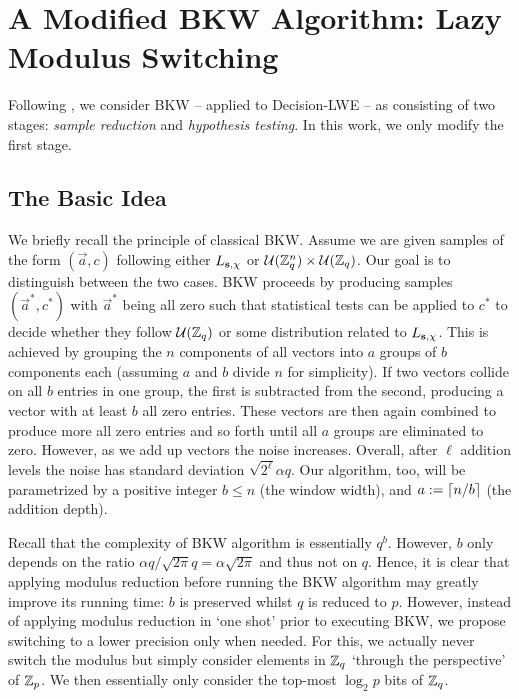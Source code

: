 \section{A Modified BKW Algorithm: Lazy Modulus Switching} \label{sec:bkw-algorithm}
Following \cite{albrecht-cid-faugere-fitzpatrick-perret:dcc2013}, we consider BKW -- applied to Decision-LWE -- as consisting of two stages: {\it sample reduction}  and {\it hypothesis testing}. In this work,  we only modify the first stage.

\subsection{The Basic Idea} 
We briefly recall the principle of classical BKW. Assume we are given samples of the form $(\vec{a}, c)$ following either $L_{\mathbf{s},\chi}$ or $\mathcal{U}(\mathbb{Z}_q^n) \times \mathcal{U}(\mathbb{Z}_q)$. Our goal is to distinguish between the two cases.  BKW proceeds by producing samples $(\vec{a}^*,c^*)$ with
$\vec{a}^*$ being all zero such that statistical tests can be applied to $c^*$ to decide whether they follow $\mathcal{U}(\mathbb{Z}_q)$ or some distribution related to $L_{\mathbf{s},\chi}$. This is achieved by grouping the $n$ components of all vectors into $a$ groups of $b$ components each (assuming $a$ and $b$ divide $n$ for simplicity). If two vectors collide on all $b$ entries in one group, the first is subtracted from the second, producing a vector with at least $b$ all zero entries. These vectors are then again combined to produce more all zero entries and so forth until all $a$ groups are eliminated to zero. However, as we add up vectors the noise increases. Overall, after $\ell$ addition levels the noise has standard deviation $\sqrt{2^\ell}\alpha q$. 
Our algorithm, too, will be parametrized by a positive integer $b\leq n$ (the window width), and  $a:= \lceil n/b \rceil$ (the addition depth).

Recall that the complexity of BKW algorithm is essentially $q^b$. However,  $b$ only depends on the ratio 
$\alpha q/\sqrt{2\pi}q= \alpha\sqrt{2\pi}$ and thus not on $q$. Hence, it is clear that applying modulus reduction before running 
the BKW algorithm may greatly improve its running time: $b$ is preserved whilst $q$ is reduced to $p$. However, instead of applying modulus 
reduction in `one shot' prior to executing BKW, we propose switching  to a lower precision only when needed. For this, we actually never 
switch the modulus but simply consider elements in $\mathbb{Z}_q$ `through the perspective' of $\mathbb{Z}_p$. We then essentially only consider the 
top-most $\log_2 p$ bits of $\mathbb{Z}_q$.

